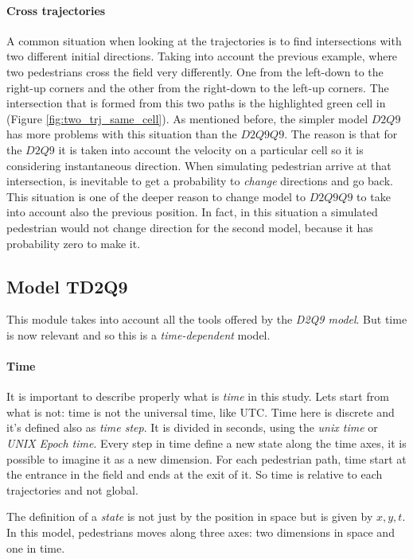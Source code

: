 \documentclass[class=article, crop=false]{standalone}
\begin{document}
\paragraph{Cross trajectories}
A common situation when looking at the trajectories is to find intersections with two different initial directions.
Taking into account the previous example, where two pedestrians cross the field very differently.
One from the left-down to the right-up corners and the other from the right-down to the left-up corners.
The intersection that is formed from this two paths is the highlighted green cell in (Figure \ref{fig:two_trj_same_cell}).
As mentioned before, the simpler model $D2Q9$ has more problems with this situation than the $D2Q9Q9$.
The reason is that for the $D2Q9$ it is taken into account the velocity on a particular cell so it is considering instantaneous direction. 
When simulating pedestrian arrive at that intersection, is inevitable to get a probability to \emph{change} directions and go back.
This situation is one of the deeper reason to change model to $D2Q9Q9$ to take into account also the previous position.
In fact, in this situation a simulated pedestrian would not change direction for the second model, because it has probability zero to make it.

\FloatBarrier
\subsection{Model TD2Q9}
This module takes into account all the tools offered by the \emph{D2Q9 model}.
But time is now relevant and so this is a \emph{time-dependent} model.

\paragraph{Time}
It is important to describe properly what is \emph{time} in this study.
Lets start from what is not: time is not the universal time, like UTC.
Time here is discrete and it's defined also as \emph{time step}.
It is divided in seconds, using the \emph{unix time} or \emph{UNIX Epoch time}.
Every step in time define a new state along the time axes, it is possible to imagine it as a new dimension.
For each pedestrian path, time start at the entrance in the field and ends at the exit of it.
So time is relative to each trajectories and not global.

The definition of a \emph{state} is not just by the position in space but is given by $x, y, t$.
In this model, pedestrians moves along three axes: two dimensions in space and one in time.
\end{document}
